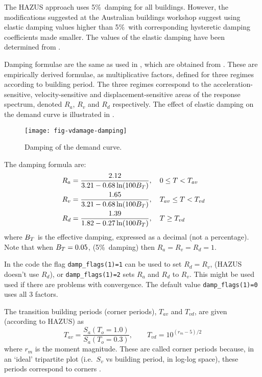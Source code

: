 The HAZUS approach uses 5\%\ damping for all buildings. However,
the modifications suggested at the Australian buildings workshop
\citep{dr_Stehle01a} suggest using elastic damping values higher
than 5\%\ with corresponding hysteretic damping coefficients made
smaller. The values of the elastic damping have been determined
from \cite{Newmark82}.

Damping formulae are the same as used in \cite{dr_FEMA99b}, which
are obtained from \cite{Newmark82}. These are empirically derived
formulae, as multiplicative factors, defined for three regimes
according to building period. The three regimes correspond to the
acceleration-sensitive, velocity-sensitive and
displacement-sensitive areas of the response spectrum, denoted
$R_a$, $R_v$ and $R_d$ respectively. The effect of elastic damping
on the demand curve is illustrated in
.

\begin{figure}[htp]
\centering
{}
\texttt{[image: fig-vdamage-damping]}
\caption{Damping of the demand curve.}
\label{fig:v-dam-damping-adrs}
\end{figure}


The damping formula are:
\begin{align}
 R_a &= \frac{2.12}{3.21-0.68\ln(100\Beff)}, \quad 0\le T < T_{av}\\
\hspace{0.3em}
 R_v &= \frac{1.65}{3.21-0.68\ln(100\Beff)}, \quad T_{av}\le T < T_{vd}\\
\hspace{0.3em}
 R_d &= \frac{1.39}{1.82-0.27\ln(100\Beff)}, \quad T \ge T_{vd}
\end{align}
where $\Beff$ is the effective damping,
expressed as a decimal (not a percentage). Note that when $\Beff =
0.05$, (5\%\ damping) then $R_a=R_v=R_d=1$.

In the code the flag \verb|damp_flags(1)=1|
can be used to set $R_d=R_v$, (HAZUS doesn't use $R_d$), or
\verb|damp_flags(1)=2| sets $R_a$ and $R_d$ to $R_v$. This might
be used used if there are problems with convergence. The default
value \verb|damp_flags(1)=0| uses all 3 factors.


The transition building periods (corner periods), $T_{av}$ and $T_{vd}$,
are given (according to HAZUS) as
\begin{equation}
 T_{av} = \frac{S_a(T_o =1.0)}{S_a(T_o =0.3)},
\qquad
 T_{vd} = 10^{(r_m-5)/2}
\end{equation}
where $r_m$ is the moment magnitude. These are called corner
periods because, in an `ideal' tripartite plot (i.e.~$S_v$ vs
building period, in log-log space), these periods correspond to
corners \citep{Newmark82}.

